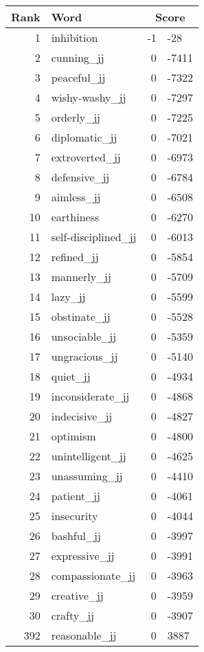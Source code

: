\begin{longtable}[!htbp]{| rlr@{.}l |}
    \hline
    \textbf{Rank} & \textbf{Word} & \multicolumn{2}{c|}{\textbf{Score}} \\
    \hline
    \endhead
    1 & inhibition & -1 & -28 \\
    2 & cunning\_jj & 0 & -7411 \\
    3 & peaceful\_jj & 0 & -7322 \\
    4 & wishy-washy\_jj & 0 & -7297 \\
    5 & orderly\_jj & 0 & -7225 \\
    6 & diplomatic\_jj & 0 & -7021 \\
    7 & extroverted\_jj & 0 & -6973 \\
    8 & defensive\_jj & 0 & -6784 \\
    9 & aimless\_jj & 0 & -6508 \\
    10 & earthiness & 0 & -6270 \\
    11 & self-disciplined\_jj & 0 & -6013 \\
    12 & refined\_jj & 0 & -5854 \\
    13 & mannerly\_jj & 0 & -5709 \\
    14 & lazy\_jj & 0 & -5599 \\
    15 & obstinate\_jj & 0 & -5528 \\
    16 & unsociable\_jj & 0 & -5359 \\
    17 & ungracious\_jj & 0 & -5140 \\
    18 & quiet\_jj & 0 & -4934 \\
    19 & inconsiderate\_jj & 0 & -4868 \\
    20 & indecisive\_jj & 0 & -4827 \\
    21 & optimism & 0 & -4800 \\
    22 & unintelligent\_jj & 0 & -4625 \\
    23 & unassuming\_jj & 0 & -4410 \\
    24 & patient\_jj & 0 & -4061 \\
    25 & insecurity & 0 & -4044 \\
    26 & bashful\_jj & 0 & -3997 \\
    27 & expressive\_jj & 0 & -3991 \\
    28 & compassionate\_jj & 0 & -3963 \\
    29 & creative\_jj & 0 & -3959 \\
    30 & crafty\_jj & 0 & -3907 \\
    392 & reasonable\_jj & 0 & 3887 \\

\end{longtable}
